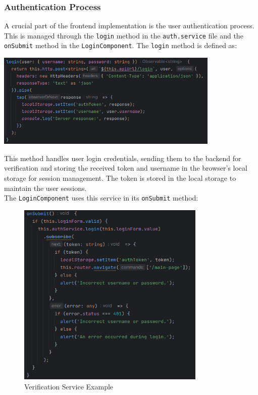 \subsubsection{Authentication Process}
A crucial part of the frontend implementation is the user authentication process. 
This is managed through the \texttt{login} method in the \texttt{auth.service} file and the \texttt{onSubmit} method in the \texttt{LoginComponent}.  The \texttt{login} method is defined as: \\

\begin{center}
\includegraphics[width=0.80\textwidth]{figs/login.png}
\end{center}

\noindent This method handles user login credentials, sending them to the backend for verification and storing the received token and 
username in the browser's local storage for session management. The token is stored in the local storage to maintain the user sessions. \\

\noindent The \texttt{LoginComponent} uses this service in its \texttt{onSubmit} method: \\

\begin{figure}[h]
  \centering
  \includegraphics[width=0.80\textwidth]{figs/on_submit.png}
  \caption{Verification Service Example}
  \label{fig:my_label}
\end{figure}

